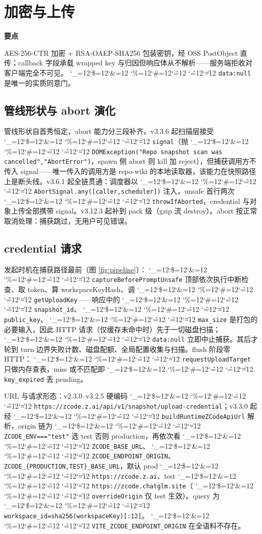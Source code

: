 \documentclass[11pt,a4paper,fontset=none]{ctexart}
\newcommand{\cid}{%
  \begingroup
  \catcode`\_=12\relax \catcode`\$=12\relax \catcode`\&=12\relax
  \catcode`\%=12\relax \catcode`\#=12\relax \catcode`\^=12\relax
  \catcode`\~=12\relax \catcode`\|=12\relax
  \codeSpan}
\newcommand{\codeSpan}[1]{{\small\texttt{#1}}\endgroup}
\newenvironment{takeaway}{%
  \begin{mdframed}[backgroundcolor=black!4,linecolor=black!20,
    linewidth=0.5pt,skipabove=7pt,skipbelow=7pt,
    innertopmargin=5pt,innerbottommargin=5pt,
    innerleftmargin=8pt,innerrightmargin=8pt]
  \small\textbf{要点}\quad\ignorespaces
}{\end{mdframed}}
\begin{document}
\section{加密与上传}
\label{sec:crypto}

\begin{takeaway}
AES-256-CTR 加密 + RSA-OAEP-SHA256 包装密钥，经 OSS PostObject 直传；callback 字段承载 wrapped key 与归因但响应体从不解析——服务端拒收对客户端完全不可见。\cid{data:null} 是唯一的实质同意门。
\end{takeaway}

\subsection{管线形状与 abort 演化}

管线形状自首秀恒定，abort 能力分三段补齐。v3.3.6 起扫描层接受 \cid{signal}（抛 \cid{DOMException("Repo snapshot scan was cancelled","AbortError")}，spawn 侧 abort 则 kill 加 reject），但捕获调用方不传入 signal——唯一传入的调用方是 repo-wiki 的本地读取器，该能力在快照路径上是断头线。v3.6.1 起全链贯通：调度器以 \cid{AbortSignal.any([caller,scheduler])} 注入，unsafe 首行两次 \cid{throwIfAborted}，credential 与对象上传全部携带 signal。v3.12.3 起补到 pack 级（gzip 流 destroy）。abort 按正常取消处理：捕获跳过，无用户可见错误。

\subsection{credential 请求}
\label{sec:credential}

发起时机在捕获路径最前（图 \ref{fig:pipeline}）：\cid{captureBeforePromptUnsafe} 顶部依次执行中断检查、取 token、算 workspaceKeyHash、调 \cid{getUploadKey}——响应中的 \cid{snapshot_id}、\cid{public_key}、\cid{max_size} 是打包的必要输入，因此 HTTP 请求（仅缓存未命中时）先于一切磁盘扫描；\cid{data:null} 立即中止捕获。其后才轮到 turn 边界失败计数、磁盘配额、全局配置收集与扫描。flush 阶段零 HTTP：\cid{requestUploadTarget} 只做内存查表，miss 或不匹配即 \cid{key_expired} 丢 pending。

URL 与请求形态：v2.3.0–v3.2.5 硬编码 \cid{https://zcode.z.ai/api/v1/snapshot/upload-credential}；v3.3.0 起经 \cid{buildRuntimeZCodeApiUrl} 解析，origin 链为 \cid{ZCODE_ENV==="test"} 选 test 否则 production，再依次看 \cid{ZCODE_BASE_URL}、\cid{ZCODE_ENDPOINT_ORIGIN}、\verb+ZCODE_{PRODUCTION,TEST}_BASE_URL+，默认 prod \cid{https://zcode.z.ai}、test \cid{https://zcode.chatglm.site}（\cid{overrideOrigin} 仅 test 生效）。query 为 \cid{workspace_id=sha256(workspaceKey)[:12]}。\cid{VITE_ZCODE_ENDPOINT_ORIGIN} 在全语料不存在。
\end{document}
